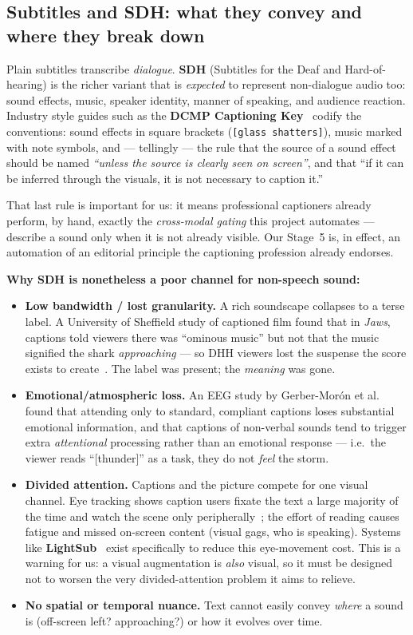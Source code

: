\documentclass[11pt,a4paper]{article}
\begin{document}
\subsection{Subtitles and SDH: what they convey and where they break down}
Plain subtitles transcribe \emph{dialogue}. \textbf{SDH} (Subtitles for the Deaf and Hard-of-hearing)
is the richer variant that is \emph{expected} to represent non-dialogue audio too: sound effects,
music, speaker identity, manner of speaking, and audience reaction. Industry style guides such as the
\textbf{DCMP Captioning Key}~\cite{dcmp} codify the conventions: sound effects in square brackets
(\texttt{[glass shatters]}), music marked with note symbols, and --- tellingly --- the rule that the
source of a sound effect should be named \emph{``unless the source is clearly seen on screen''}, and
that ``if it can be inferred through the visuals, it is not necessary to caption it.''

That last rule is important for us: it means professional captioners already perform, by hand, exactly
the \emph{cross-modal gating} this project automates --- describe a sound only when it is not already
visible. Our Stage~5 is, in effect, an automation of an editorial principle the captioning profession
already endorses.

\medskip\noindent\textbf{Why SDH is nonetheless a poor channel for non-speech sound:}
\begin{itemize}
  \item \textbf{Low bandwidth / lost granularity.} A rich soundscape collapses to a terse label. A
    University of Sheffield study of captioned film found that in \emph{Jaws}, captions told viewers
    there was ``ominous music'' but not that the music signified the shark \emph{approaching} --- so
    DHH viewers lost the suspense the score exists to create~\cite{sheffield}. The label was present;
    the \emph{meaning} was gone.
  \item \textbf{Emotional/atmospheric loss.} An EEG study by Gerber-Mor\'on et al.~\cite{captionlimits}
    found that attending only to standard, compliant captions loses substantial emotional
    information, and that captions of non-verbal sounds tend to trigger extra \emph{attentional}
    processing rather than an emotional response --- i.e.\ the viewer reads ``[thunder]'' as a task,
    they do not \emph{feel} the storm.
  \item \textbf{Divided attention.} Captions and the picture compete for one visual channel. Eye
    tracking shows caption users fixate the text a large majority of the time and watch the scene only
    peripherally~\cite{captionvstranscript}; the effort of reading causes fatigue and missed on-screen
    content (visual gags, who is speaking). Systems like \textbf{LightSub}~\cite{lightsub} exist
    specifically to reduce this eye-movement cost. This is a warning for us: a visual augmentation is
    \emph{also} visual, so it must be designed not to worsen the very divided-attention problem it
    aims to relieve.
  \item \textbf{No spatial or temporal nuance.} Text cannot easily convey \emph{where} a sound is
    (off-screen left? approaching?) or how it evolves over time.
\end{itemize}
\end{document}
